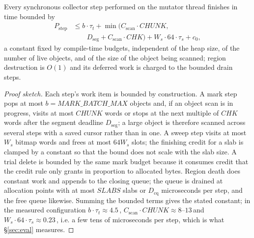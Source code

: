 \begin{theorem}
\label{thm:pause}
Every synchronous collector step performed on the mutator thread finishes in time bounded by
\begin{equation*}
\begin{aligned}
P_{\text{step}} &\le b \cdot \tau_t + \min(C_{\text{scan}}\cdot \mathit{CHUNK},\\
&\qquad D_{\text{seg}} + C_{\text{scan}}\cdot \mathit{CHK}) + W_s \cdot 64 \cdot \tau_s + c_0,
\end{aligned}
\end{equation*}
a constant fixed by compile-time budgets, independent of the heap size, of the number of live
objects, and of the size of the object being scanned; region destruction is $O(1)$ and its deferred
work is charged to the bounded drain steps.
\end{theorem}
\begin{proof}[Proof sketch]
Each step's work item is bounded by construction.
A mark step pops at most $b = \mathit{MARK\_BATCH\_MAX}$ objects and, if an object scan is in
progress, visits at most $\mathit{CHUNK}$ words or stops at the next multiple of
$\mathit{CHK}$ words after the segment deadline $D_{\text{seg}}$; a large object is therefore
scanned across several steps with a saved cursor rather than in one.
A sweep step visits at most $W_s$ bitmap words and frees at most $64 W_s$ slots; the finishing
credit for a slab is clamped by a constant so that the bound does not scale with the slab size.
A trial delete is bounded by the same mark budget because it consumes credit that the credit rule
only grants in proportion to allocated bytes.
Region death does constant work and appends to the closing queue; the queue is drained at
allocation points with at most $\mathit{SLABS}$ slabs or $D_{\text{cq}}$ microseconds per step, and
the free queue likewise.
Summing the bounded terms gives the stated constant; in the measured configuration
$b\cdot\tau_t \approx 4.5$\,\us, $C_{\text{scan}}\cdot\mathit{CHUNK} \approx 8$--$13$\,\us and
$W_s\cdot 64\cdot \tau_s \approx 0.23$\,\us, i.e. a few tens of microseconds per step, which is
what \S\ref{sec:eval} measures.
\end{proof}

